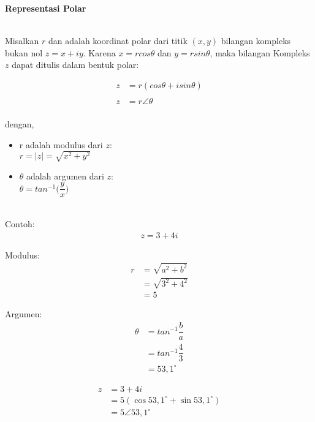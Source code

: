 \documentclass{article}
\begin{document}
\newpage
\begin{center}
    \textbf{Representasi Polar}
\end{center}
\leavevmode\\

Misalkan $r$ dan adalah koordinat polar dari titik $(x, y)$ bilangan kompleks bukan nol $z = x + iy$. Karena $x = r cos \theta $ dan $y = r sin \theta$, maka bilangan Kompleks $z$ dapat
ditulis dalam bentuk polar:

\begin{align}
    z & = r(cos \theta + i sin \theta)
    \\\nonumber\\
    z & = r \angle \theta
    \\\nonumber
\end{align}

dengan,
\begin{itemize}
    \item r adalah modulus dari $z$:\\
          $ r = |z| = \sqrt{x^2+y^2} $
    \item $\theta$ adalah argumen dari $z$:\\
          $ \theta = tan^{-1} \bigg(\dfrac{y}{x}\bigg) $
\end{itemize}
\leavevmode\\

Contoh:
\begin{align}
    z = 3 + 4i \nonumber
\end{align}

Modulus:
\begin{align}
    r & = \sqrt{a^2 + b^2}
    \nonumber              \\
      & = \sqrt{3^2 + 4^2}
    \nonumber              \\
      & = 5
    \nonumber
\end{align}

Argumen:
\begin{align}
    \theta & = tan^{-1} \dfrac{b}{a}
    \nonumber                        \\
           & = tan^{-1} \dfrac{4}{3}
    \nonumber                        \\
           & = 53,1^{\circ}
    \nonumber
\end{align}

\begin{align}
    z & = 3 + 4i
    \nonumber                                      \\
      & = 5(\cos 53,1^{\circ} + \sin 53,1^{\circ})
    \nonumber                                      \\
      & = 5 \angle 53,1^{\circ}
\end{align}
\end{document}
